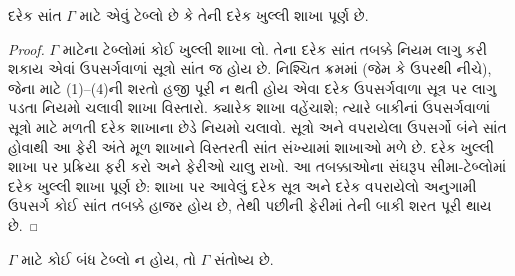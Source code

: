 \begin{prop}
  દરેક સાંત $\Gamma$ માટે એવું ટેબ્લો છે કે તેની દરેક
  ખુલ્લી શાખા પૂર્ણ છે.
\end{prop}

\begin{proof}
  $\Gamma$ માટેના ટેબ્લોમાં કોઈ ખુલ્લી શાખા લો. તેના
  દરેક સાંત તબક્કે નિયમ લાગુ કરી શકાય એવાં ઉપસર્ગવાળાં
  સૂત્રો સાંત જ હોય છે. નિશ્ચિત ક્રમમાં (જેમ કે ઉપરથી
  નીચે), જેના માટે (1)--(4)ની શરતો હજી પૂરી ન થતી હોય એવા
  દરેક ઉપસર્ગવાળા સૂત્ર પર લાગુ પડતા નિયમો ચલાવી
  શાખા વિસ્તારો. ક્યારેક શાખા વહેંચાશે; ત્યારે બાકીનાં
  ઉપસર્ગવાળાં સૂત્રો માટે મળતી દરેક શાખાના છેડે
  નિયમો ચલાવો. સૂત્રો અને વપરાયેલા ઉપસર્ગો બંને સાંત હોવાથી
  આ ફેરી અંતે મૂળ શાખાને વિસ્તરતી સાંત સંખ્યામાં શાખાઓ
  મળે છે. દરેક ખુલ્લી શાખા પર પ્રક્રિયા ફરી કરો અને ફેરીઓ
  ચાલુ રાખો. આ તબક્કાઓના સંઘરૂપ સીમા-ટેબ્લોમાં દરેક
  ખુલ્લી શાખા પૂર્ણ છે: શાખા પર આવેલું દરેક સૂત્ર અને દરેક
  વપરાયેલો અનુગામી ઉપસર્ગ કોઈ સાંત તબક્કે હાજર હોય છે,
  તેથી પછીની ફેરીમાં તેની બાકી શરત પૂરી થાય છે.
\end{proof}

\begin{thm}[પૂર્ણતા]
  $\Gamma$ માટે કોઈ બંધ ટેબ્લો ન હોય, તો $\Gamma$ સંતોષ્ય છે.
\end{thm}

